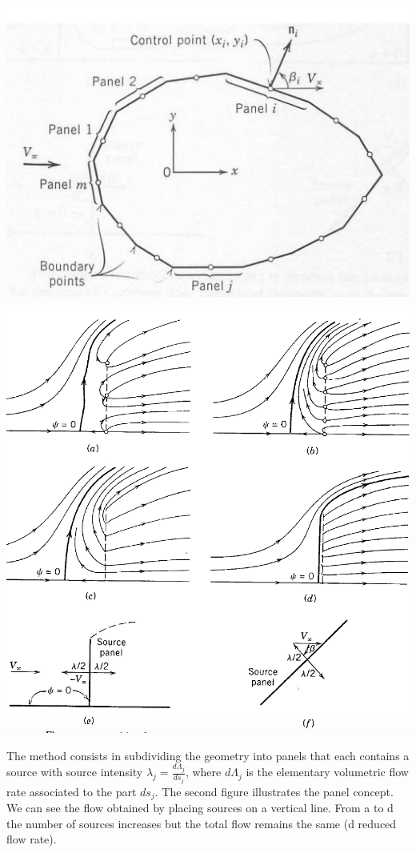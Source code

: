 	\begin{center}
	\begin{minipage}{0.4\textwidth}
	\includegraphics[scale=0.25]{ch2/39}
	\end{minipage}
	\begin{minipage}{0.4\textwidth}
	\includegraphics[scale=0.25]{ch2/40}
	\end{minipage}
	\end{center}
	The method consists in subdividing the geometry into panels that each contains a source with source intensity $\lambda _j =\frac{d\Lambda _j}{ds_j}$, where $d\Lambda _j$ is the elementary volumetric flow rate associated to the part $ds_j$. The second figure illustrates the panel concept. We can see the flow obtained by placing sources on a vertical line. From a to d the number of sources increases but the total flow remains the same (d reduced flow rate). \\
	
